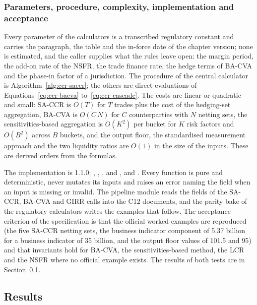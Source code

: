 \subsubsection{Parameters, procedure, complexity, implementation and acceptance}

Every parameter of the calculators is a transcribed regulatory constant and carries the paragraph, the table and the in-force date of the chapter version; none is estimated, and the caller supplies what the rules leave open: the margin period, the add-on rate of the NSFR, the trade finance rate, the hedge terms of BA-CVA and the phase-in factor of a jurisdiction. The procedure
of the central calculator is Algorithm~\ref{alg:ccr-saccr}; the others are direct evaluations of Equations~\ref{eq:ccr-bacva} to~\ref{eq:ccr-cascade}. The costs are linear or quadratic and small: SA-CCR is $O(T)$ for $T$ trades plus the cost of the hedging-set aggregation, BA-CVA is $O(C\,N)$ for $C$ counterparties with $N$ netting sets, the sensitivities-based aggregation is $O(K^2)$ per bucket for $K$ risk factors and $O(B^2)$ across $B$
buckets, and the output floor, the standardised measurement approach and the two liquidity ratios are $O(1)$ in the size of the inputs. These are derived orders from the formulas.

The implementation is  1.1.0: , , ,  and , and . Every function is pure and deterministic, never mutates its inputs and raises an error naming the field when an input is missing or invalid. The pipeline module  reads the fields of the SA-CCR, BA-CVA and GIRR calls
into the C12 documents, and the parity bake of the regulatory calculators writes the examples that follow. The acceptance criterion of the specification is that the official worked examples are reproduced (the five SA-CCR netting sets, the business indicator component of 5.37 billion for a business indicator of 35 billion, and the output floor values of 101.5 and 95) and that invariants hold for BA-CVA, the sensitivities-based method, the LCR and
the NSFR where no official example exists. The results of both tests are in Section~\ref{sec:results-ccr}.

\subsection{Results}
\label{sec:results-ccr}

